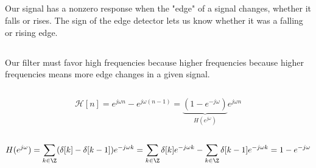\documentclass{article}
\begin{document}
\subsection{}

Our signal has a nonzero response when the "edge" of a signal changes, whether it falls or rises.
The sign of the edge detector lets us know whether it was a falling or rising edge.

\subsection{}

Our filter must favor high frequencies because higher frequencies because higher frequencies means more edge changes in a given signal.

\subsection{}

\begin{equation}
    \mathcal{H}[n] = e^{j \omega n} - e^{j \omega (n - 1)} = \underbrace{(1 - e^{-j \omega})}_{H(e^{j \omega})} e^{j \omega n}
\end{equation}

\subsection{}

\begin{equation}
    H(e^{j \omega}) = \sum_{k \in \Z} (\delta[k] - \delta[k - 1]) e^{-j \omega k} = \sum_{k \in \Z} \delta[k] e^{-j \omega k} - \sum_{k \in \Z} \delta[k - 1] e^{-j \omega k} = 1 - e^{-j \omega}
\end{equation}

\subsection{}
\end{document}
